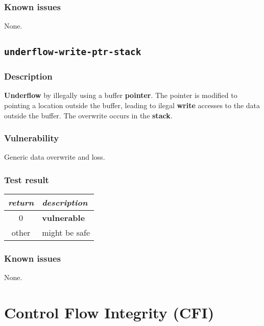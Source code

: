 \documentclass[a4paper]{book}
\begin{document}
\subsubsection{Known issues}

None.

\newpage

\subsection{\texttt{underflow-write-ptr-stack}}\label{test-underflow-write-ptr-stack}

\subsubsection{Description}

\textbf{Underflow} by illegally using a buffer \textbf{pointer}.
The pointer is modified to pointing a location outside the buffer,
leading to ilegal \textbf{write} accesses to the data outside the buffer.
The overwrite occurs in the \textbf{stack}.

\subsubsection{Vulnerability}
Generic data overwrite and loss.

\subsubsection{Test result}

\begin{tabular}{cl}
  \toprule
  \emph{return}  & \emph{description} \\
  \midrule
  0              & \textbf{vulnerable} \\
  other          & might be safe \\
  \bottomrule
\end{tabular}

\subsubsection{Known issues}

None.

\newpage

\section{Control Flow Integrity (CFI)}
\end{document}
